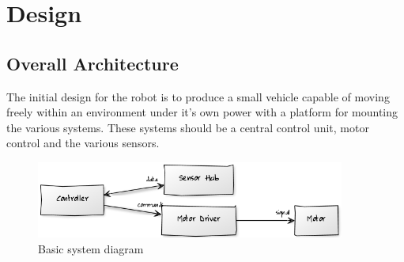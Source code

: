 \chapter{Design}








\section{Overall Architecture}
The initial design for the robot is to produce a small vehicle capable of moving freely within an environment under it's own power with a platform for mounting the various systems.  These systems should be a central control unit, motor control and the various sensors.

\begin{figure}[H]
\centering
        \includegraphics[width=4.0in] {Images/basic-uml.png}
        \caption{Basic system diagram}
        \label{Basic system diagram}
\end{figure}


